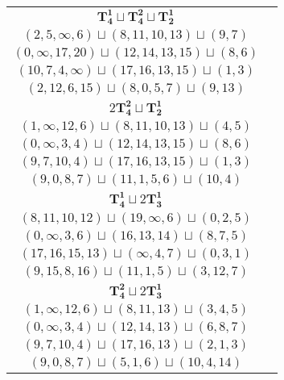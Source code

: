 \documentclass{article}
\begin{document}
\begin{longtable}{|c|c|}
        \hline
        $\mathbf{T_{4}^{1}} \sqcup \mathbf{T_{4}^{2}} \sqcup \mathbf{T_{2}^{1}}$ & \begin{tabular}{c}
        $(11,9,\infty,1)\sqcup(10,12,13,15)\sqcup(4,5)$ \\ 
        $(2,5,\infty,6)\sqcup(8,11,10,13)\sqcup(9,7)$ \\ 
        $(0,\infty,17,20)\sqcup(12,14,13,15)\sqcup(8,6)$ \\ 
        $(10,7,4,\infty)\sqcup(17,16,13,15)\sqcup(1,3)$ \\ 
        $(2,12,6,15)\sqcup(8,0,5,7)\sqcup(9,13)$
        \end{tabular} \\ 
        \hline
        $2\mathbf{T_{4}^{2}} \sqcup \mathbf{T_{2}^{1}}$ & \begin{tabular}{c}
        $(18,16,19,\infty)\sqcup(10,12,13,15)\sqcup(3,6)$ \\ 
        $(1,\infty,12,6)\sqcup(8,11,10,13)\sqcup(4,5)$ \\ 
        $(0,\infty,3,4)\sqcup(12,14,13,15)\sqcup(8,6)$ \\ 
        $(9,7,10,4)\sqcup(17,16,13,15)\sqcup(1,3)$ \\ 
        $(9,0,8,7)\sqcup(11,1,5,6)\sqcup(10,4)$
        \end{tabular} \\ 
        \hline
        $\mathbf{T_{4}^{1}} \sqcup 2\mathbf{T_{3}^{1}}$ & \begin{tabular}{c}
        $(11,13,12,15)\sqcup(9,\infty,1)\sqcup(2,4,5)$ \\ 
        $(8,11,10,12)\sqcup(19,\infty,6)\sqcup(0,2,5)$ \\ 
        $(0,\infty,3,6)\sqcup(16,13,14)\sqcup(8,7,5)$ \\ 
        $(17,16,15,13)\sqcup(\infty,4,7)\sqcup(0,3,1)$ \\ 
        $(9,15,8,16)\sqcup(11,1,5)\sqcup(3,12,7)$
        \end{tabular} \\ 
        \hline
        $\mathbf{T_{4}^{2}} \sqcup 2\mathbf{T_{3}^{1}}$ & \begin{tabular}{c}
        $(18,16,19,\infty)\sqcup(13,12,15)\sqcup(5,3,6)$ \\ 
        $(1,\infty,12,6)\sqcup(8,11,13)\sqcup(3,4,5)$ \\ 
        $(0,\infty,3,4)\sqcup(12,14,13)\sqcup(6,8,7)$ \\ 
        $(9,7,10,4)\sqcup(17,16,13)\sqcup(2,1,3)$ \\ 
        $(9,0,8,7)\sqcup(5,1,6)\sqcup(10,4,14)$

\end{tabular}
\end{longtable}
\end{document}
